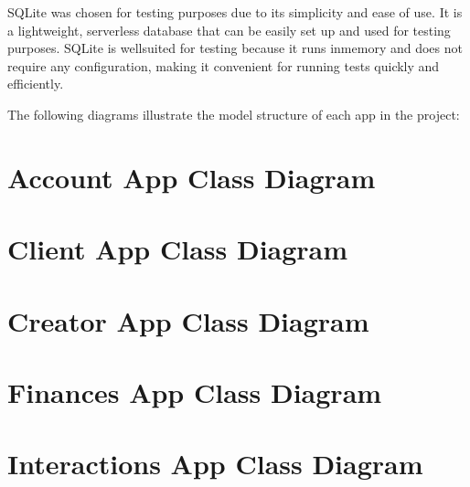 \documentclass[letterpaper,10pt,english]{sphinxmanual}
\begin{document}
\sphinxAtStartPar
SQLite was chosen for testing purposes due to its simplicity and ease of use. It is a lightweight, serverless database that can be easily set up and used for testing purposes. SQLite is well\sphinxhyphen{}suited for testing because it runs in\sphinxhyphen{}memory and does not require any configuration, making it convenient for running tests quickly and efficiently.

\sphinxAtStartPar
The following diagrams illustrate the model structure of each app in the project:


\section{Account App Class Diagram}
\label{\detokenize{modules/diagrams:account-app-class-diagram}}


\section{Client App Class Diagram}
\label{\detokenize{modules/diagrams:client-app-class-diagram}}


\section{Creator App Class Diagram}
\label{\detokenize{modules/diagrams:creator-app-class-diagram}}


\section{Finances App Class Diagram}
\label{\detokenize{modules/diagrams:finances-app-class-diagram}}


\section{Interactions App Class Diagram}
\label{\detokenize{modules/diagrams:interactions-app-class-diagram}}
\end{document}
